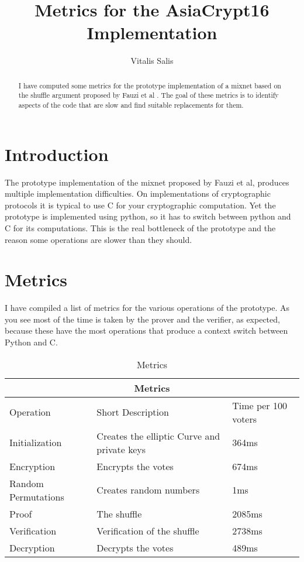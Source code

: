 \documentclass{article}
\date{}
\begin{document}
\title{Metrics for the AsiaCrypt16 Implementation} 

\author{Vitalis Salis}

\maketitle
\begin{abstract}
	I have computed some metrics for the prototype implementation \cite{prototype} of a mixnet based
    on the shuffle argument proposed by Fauzi et al \cite{shufflearg}. The goal of these metrics
    is to identify aspects of the code that are slow and find suitable replacements
    for them.
\end{abstract}

\section{Introduction}

The prototype implementation of the mixnet proposed by Fauzi et al, produces multiple
implementation difficulties. On implementations of cryptographic protocols it is typical
to use C for your cryptographic computation. Yet the prototype is implemented using python,
so it has to switch between python and C for its computations. This is the real bottleneck
of the prototype and the reason some operations are slower than they should.

\section{Metrics}

I have compiled a list of metrics for the various operations of the prototype. As you see
most of the time is taken by the prover and the verifier, as expected, because these have
the most operations that produce a context switch between Python and C.

\begin{table}
\begin{tabular}{ |p{3cm}|p{5cm}|p{3cm}|  }
    \hline
    \multicolumn{3}{|c|}{Metrics}\\
    \hline
    Operation & Short Description & Time per 100 voters\\
    \hline
    Initialization & Creates the elliptic Curve and private keys & 364ms\\
    Encryption & Encrypts the votes & 674ms\\
    Random Permutations & Creates random numbers & 1ms\\
    Proof & The shuffle & 2085ms\\
    Verification & Verification of the shuffle & 2738ms\\
    Decryption & Decrypts the votes & 489ms\\
    \hline
\end{tabular}
\caption{Metrics}
\end{table}
\end{document}
